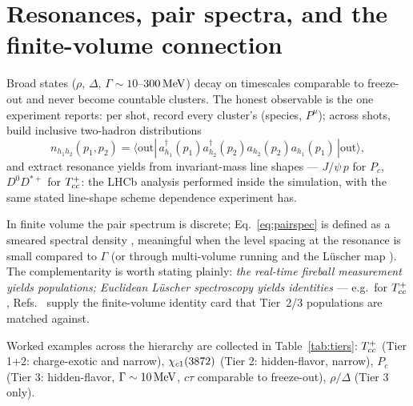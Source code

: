 \section{Resonances, pair spectra, and the finite-volume connection}
\label{sec:resonances}

Broad states ($\rho$, $\Delta$, $\Gamma\sim10$--$300\,\mathrm{MeV}$) decay on
timescales comparable to freeze-out and never become countable clusters.
The honest observable is the one experiment reports: per shot, record
every cluster's (species, $P^\mu$); across shots, build inclusive
two-hadron distributions
\begin{equation}
n_{h_1h_2}(p_1,p_2)=\langle \mathrm{out}|\,
a^\dagger_{h_1}(p_1)a^\dagger_{h_2}(p_2)
a_{h_2}(p_2)a_{h_1}(p_1)\,|\mathrm{out}\rangle,
\label{eq:pairspec}
\end{equation}
and extract resonance yields from invariant-mass line shapes ---
$J/\psi\,p$ for $P_c$, $D^0D^{*+}$ for $T_{cc}^{+}$: the LHCb analysis performed
inside the simulation, with the same stated line-shape scheme dependence
experiment has.

In finite volume the pair spectrum is discrete; Eq.~\eqref{eq:pairspec} is
defined as a smeared spectral density \cite{Hansen:2019idp}, meaningful
when the level spacing at the resonance is small compared to $\Gamma$ (or
through multi-volume running and the L\"uscher map
\cite{Luscher:1990ux,Briceno:2017max}).  The complementarity is worth
stating plainly: \emph{the real-time fireball measurement yields
populations; Euclidean L\"uscher spectroscopy yields identities} ---
e.g.\ for $T_{cc}^{+}$, Refs.~\cite{Padmanath:2022cvl,Raposo:2023oru} supply the
finite-volume identity card that Tier~2/3 populations are matched against.

Worked examples across the hierarchy are collected in
Table~\ref{tab:tiers}: $T_{cc}^{+}$ (Tier 1+2: charge-exotic and narrow),
$\chi_{c1}(3872)$ (Tier 2: hidden-flavor, narrow), $P_c$ (Tier 3: hidden-flavor,
$\Gamma\sim10\,\mathrm{MeV}$, $c\tau$ comparable to freeze-out), $\rho/\Delta$
(Tier 3 only).

